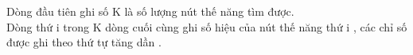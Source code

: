 Dòng đầu tiên ghi số K là số lượng nút thế năng tìm được.
\\Dòng thứ i trong K dòng cuối cùng ghi số hiệu của nút thế năng thứ i , các chỉ số được ghi theo thứ tự tăng dần .